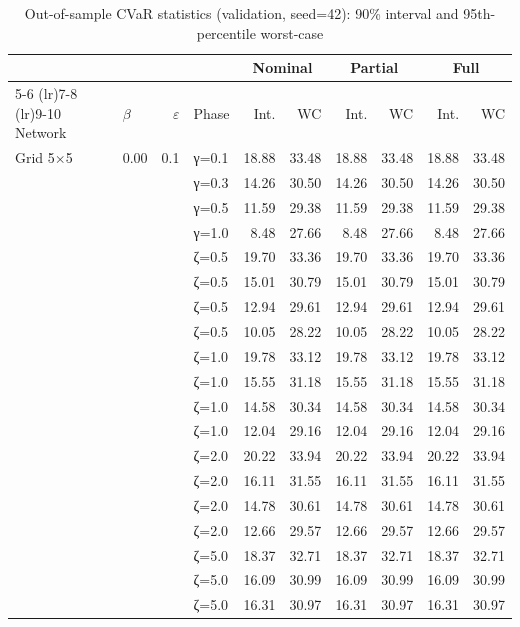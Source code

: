 \begin{table}[htbp]
\centering
\caption{Out-of-sample CVaR statistics (validation, seed=42): 90\% interval and 95th-percentile worst-case}
\label{tab:oos_validation}
\scriptsize
\begin{tabular}{ll r l  rr  rr  rr}
\toprule
 & & & & \multicolumn{2}{c}{Nominal} & \multicolumn{2}{c}{Partial} & \multicolumn{2}{c}{Full} \\
\cmidrule(lr){5-6} \cmidrule(lr){7-8} \cmidrule(lr){9-10}
Network & $\beta$ & $\varepsilon$ & Phase & Int. & WC & Int. & WC & Int. & WC \\
\midrule
 Grid 5$\times$5 & 0.00 & 0.1 & γ=0.1 & 18.88 & 33.48 & 18.88 & 33.48 & 18.88 & 33.48 \\
  &  &  & γ=0.3 & 14.26 & 30.50 & 14.26 & 30.50 & 14.26 & 30.50 \\
  &  &  & γ=0.5 & 11.59 & 29.38 & 11.59 & 29.38 & 11.59 & 29.38 \\
  &  &  & γ=1.0 & 8.48 & 27.66 & 8.48 & 27.66 & 8.48 & 27.66 \\
  &  &  & ζ=0.5 & 19.70 & 33.36 & 19.70 & 33.36 & 19.70 & 33.36 \\
  &  &  & ζ=0.5 & 15.01 & 30.79 & 15.01 & 30.79 & 15.01 & 30.79 \\
  &  &  & ζ=0.5 & 12.94 & 29.61 & 12.94 & 29.61 & 12.94 & 29.61 \\
  &  &  & ζ=0.5 & 10.05 & 28.22 & 10.05 & 28.22 & 10.05 & 28.22 \\
  &  &  & ζ=1.0 & 19.78 & 33.12 & 19.78 & 33.12 & 19.78 & 33.12 \\
  &  &  & ζ=1.0 & 15.55 & 31.18 & 15.55 & 31.18 & 15.55 & 31.18 \\
  &  &  & ζ=1.0 & 14.58 & 30.34 & 14.58 & 30.34 & 14.58 & 30.34 \\
  &  &  & ζ=1.0 & 12.04 & 29.16 & 12.04 & 29.16 & 12.04 & 29.16 \\
  &  &  & ζ=2.0 & 20.22 & 33.94 & 20.22 & 33.94 & 20.22 & 33.94 \\
  &  &  & ζ=2.0 & 16.11 & 31.55 & 16.11 & 31.55 & 16.11 & 31.55 \\
  &  &  & ζ=2.0 & 14.78 & 30.61 & 14.78 & 30.61 & 14.78 & 30.61 \\
  &  &  & ζ=2.0 & 12.66 & 29.57 & 12.66 & 29.57 & 12.66 & 29.57 \\
  &  &  & ζ=5.0 & 18.37 & 32.71 & 18.37 & 32.71 & 18.37 & 32.71 \\
  &  &  & ζ=5.0 & 16.09 & 30.99 & 16.09 & 30.99 & 16.09 & 30.99 \\
  &  &  & ζ=5.0 & 16.31 & 30.97 & 16.31 & 30.97 & 16.31 & 30.97 \\

\end{tabular}
\end{table}
